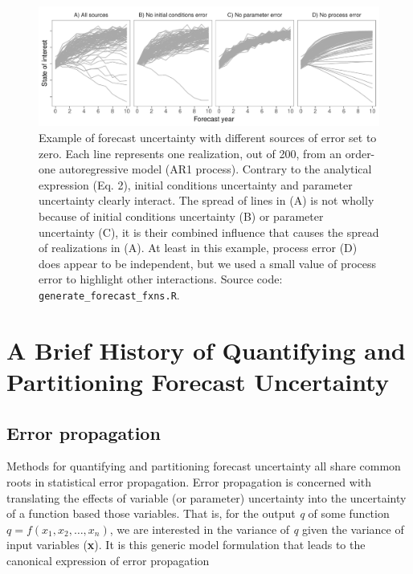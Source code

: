 \documentclass[12pt,]{article}
\begin{document}
\begin{figure}
\centering
\includegraphics{../figures/forecast_uncertainty_example.pdf}
\caption{Example of forecast uncertainty with different sources of error
set to zero. Each line represents one realization, out of 200, from an
order-one autoregressive model (AR1 process). Contrary to the analytical
expression (Eq. 2), initial conditions uncertainty and parameter
uncertainty clearly interact. The spread of lines in (A) is not wholly
because of initial conditions uncertainty (B) or parameter uncertainty
(C), it is their combined influence that causes the spread of
realizations in (A). At least in this example, process error (D) does
appear to be independent, but we used a small value of process error to
highlight other interactions. Source code:
\texttt{generate\_forecast\_fxns.R}.}
\end{figure}

\hypertarget{a-brief-history-of-quantifying-and-partitioning-forecast-uncertainty}{%
\section{A Brief History of Quantifying and Partitioning Forecast
Uncertainty}\label{a-brief-history-of-quantifying-and-partitioning-forecast-uncertainty}}

\hypertarget{error-propagation}{%
\subsection{Error propagation}\label{error-propagation}}

Methods for quantifying and partitioning forecast uncertainty all share
common roots in statistical error propagation. Error propagation is
concerned with translating the effects of variable (or parameter)
uncertainty into the uncertainty of a function based those variables.
That is, for the output \emph{q} of some function
\(q = f(x_1,x_2,\dots,x_n)\), we are interested in the variance of
\emph{q} given the variance of input variables (\textbf{x}). It is this
generic model formulation that leads to the canonical expression of
error propagation
\end{document}
